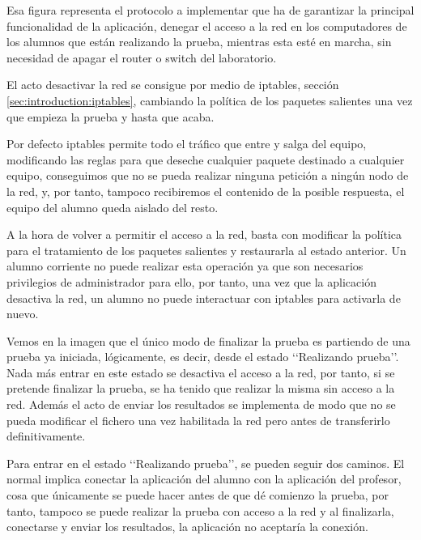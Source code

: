 Esa figura representa el protocolo a implementar que ha de garantizar la principal funcionalidad de la aplicación, denegar el acceso a la red en los computadores de los alumnos que están realizando la prueba, mientras esta esté en marcha, sin necesidad de apagar el router o switch del laboratorio.
\newline



El acto desactivar la red se consigue por medio de iptables, sección \ref{sec:introduction:iptables}, cambiando la política de los paquetes salientes una vez que empieza la prueba y hasta que acaba.
\newline

Por defecto iptables permite todo el tráfico que entre y salga del equipo, modificando las reglas para que deseche cualquier paquete destinado a cualquier equipo, conseguimos que no se pueda realizar ninguna petición a ningún nodo de la red, y, por tanto, tampoco recibiremos el contenido de la posible respuesta, el equipo del alumno queda aislado del resto.
\newline

A la hora de volver a permitir el acceso a la red, basta con modificar la política para el tratamiento de los paquetes salientes y restaurarla al estado anterior. Un alumno corriente no puede realizar esta operación ya que son necesarios privilegios de administrador para ello, por tanto, una vez que la aplicación desactiva la red, un alumno no puede interactuar con iptables para activarla de nuevo.
\newline


Vemos en la imagen que el único modo de finalizar la prueba es partiendo de una prueba ya iniciada, lógicamente, es decir, desde el estado \lq\lq Realizando prueba\rq\rq. Nada más entrar en este estado se desactiva el acceso a la red, por tanto, si se pretende finalizar la prueba, se ha tenido que realizar la misma sin acceso a la red. Además el acto de enviar los resultados se implementa de modo que no se pueda modificar el fichero una vez habilitada la red pero antes de transferirlo definitivamente.
\newline

Para entrar en el estado \lq\lq Realizando prueba\rq\rq, se pueden seguir dos caminos. El normal implica conectar la aplicación del alumno con la aplicación del profesor, cosa que únicamente se puede hacer antes de que dé comienzo la prueba, por tanto, tampoco se puede realizar la prueba con acceso a la red y al finalizarla, conectarse y enviar los resultados, la aplicación no aceptaría la conexión.
\newline

